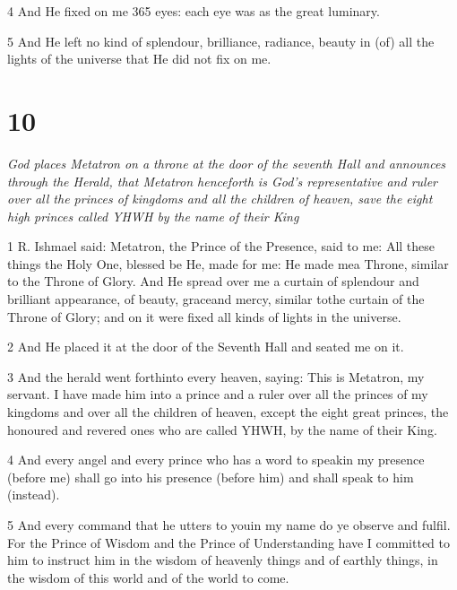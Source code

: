 \par 4 And He fixed on me 365 eyes: each eye was as the great luminary.

\par 5 And He left no kind of splendour, brilliance, radiance, beauty in (of) all the lights of the universe that He did not fix on me. 

\chapter{10}

\par \textit{God places Metatron on a throne at the door of the seventh Hall and announces through the Herald, that Metatron henceforth is God's representative and ruler over all the princes of kingdoms and all the children of heaven, save the eight high princes called YHWH by the name of their King}

\par 1 R. Ishmael said: Metatron, the Prince of the Presence, said to me: All these things the Holy One, blessed be He, made for me: He made mea Throne, similar to the Throne of Glory. And He spread over me a curtain of splendour and brilliant appearance, of beauty, graceand mercy, similar tothe curtain of the Throne of Glory; and on it were fixed all kinds of lights in the universe. 

\par 2 And He placed it at the door of the Seventh Hall and seated me on it. 

\par 3 And the herald went forthinto every heaven, saying: This is Metatron, my servant. I have made him into a prince and a ruler over all the princes of my kingdoms and over all the children of heaven, except the eight great princes, the honoured and revered ones who are called YHWH, by the name of their King.

\par 4 And every angel and every prince who has a word to speakin my presence (before me) shall go into his presence (before him) and shall speak to him (instead).

\par 5 And every command that he utters to youin my name do ye observe and fulfil. For the Prince of Wisdom and the Prince of Understanding have I committed to him to instruct him in the wisdom of heavenly things and of earthly things, in the wisdom of this world and of the world to come.

